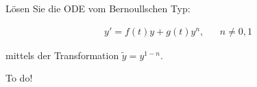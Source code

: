 \begin{exercise}
  Lösen Sie die ODE vom Bernoullschen Typ:

  \begin{align*}
    y' = f(t)y + g(t) y^n , && n \neq 0,1
  \end{align*}

  mittels der Transformation $\tilde{y} = y^{1-n}$.
\end{exercise}

\begin{solution}
  To do!
\end{solution}
